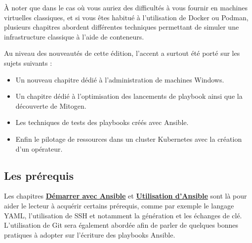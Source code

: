 \documentclass[hidelinks]{article}
\begin{document}
À noter que dans le cas où vous auriez des difficultés à vous fournir en machines virtuelles classiques, et si vous êtes habitué à l'utilisation de Docker ou Podman, plusieurs chapitres abordent différentes techniques permettant de simuler une infrastructure classique à l'aide de conteneurs.

Au niveau des nouveautés de cette édition, l'accent a surtout été porté sur les sujets suivants :
\begin{itemize}
    \item Un nouveau chapitre dédié à l'administration de machines Windows.
    \item Un chapitre dédié à l'optimisation des lancements de playbook ainsi que la découverte de Mitogen.
    \item Les techniques de tests des playbooks créés avec Ansible.
    \item Enfin le pilotage de ressources dans un cluster Kubernetes avec la création d'un opérateur.
\end{itemize}

\subsection{Les prérequis}
Les chapitres \hyperref[sec:Démarrer avec Ansible]{\textbf{Démarrer avec Ansible}} et \hyperref[sec:Utilisation d'Ansible]{\textbf{Utilisation d'Ansible}} sont là pour aider le lecteur à acquérir certains prérequis, comme par exemple le langage YAML, l'utilisation de SSH et notamment la génération et les échanges de clé. L'utilisation de Git sera également abordée afin de parler de quelques bonnes pratiques à adopter sur l'écriture des playbooks Ansible.
\end{document}
